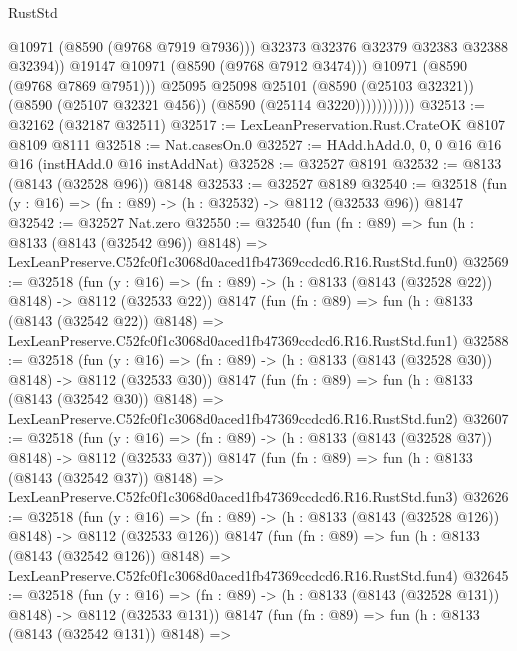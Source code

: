 \begin{lexlean}{RustStd}
\begin{coremodule}
                                @10971
                                (@8590 (@9768 @7919 @7936)))
                              @32373
                              @32376
                              @32379
                              @32383
                              @32388
                              @32394))
                          @19147
                          @10971
                          (@8590 (@9768 @7912 @3474)))
                        @10971
                        (@8590 (@9768 @7869 @7951)))
                      @25095
                      @25098
                      @25101
                      (@8590 (@25103 @32321))
                      (@8590 (@25107 @32321 @456))
                      (@8590 (@25114 @3220)))))))))))
@32513 := @32162 (@32187 @32511)
@32517 := LexLeanPreservation.Rust.CrateOK @8107 @8109 @8111
@32518 := Nat.casesOn.{0}
@32527 := HAdd.hAdd.{0, 0, 0} @16 @16 @16 (instHAdd.{0} @16 instAddNat)
@32528 := @32527 @8191
@32532 := @8133 (@8143 (@32528 @96)) @8148
@32533 := @32527 @8189
@32540 := @32518 (fun (y : @16) => (fn : @89) -> (h : @32532) -> @8112 (@32533 @96)) @8147
@32542 := @32527 Nat.zero
@32550 := @32540
    (fun (fn : @89) =>
    fun (h : @8133 (@8143 (@32542 @96)) @8148) =>
    LexLeanPreserve.C52fc0f1c3068d0aced1fb47369ccdcd6.R16.RustStd.fun0)
@32569 := @32518
    (fun (y : @16) => (fn : @89) -> (h : @8133 (@8143 (@32528 @22)) @8148) -> @8112 (@32533 @22))
    @8147
    (fun (fn : @89) =>
    fun (h : @8133 (@8143 (@32542 @22)) @8148) =>
    LexLeanPreserve.C52fc0f1c3068d0aced1fb47369ccdcd6.R16.RustStd.fun1)
@32588 := @32518
    (fun (y : @16) => (fn : @89) -> (h : @8133 (@8143 (@32528 @30)) @8148) -> @8112 (@32533 @30))
    @8147
    (fun (fn : @89) =>
    fun (h : @8133 (@8143 (@32542 @30)) @8148) =>
    LexLeanPreserve.C52fc0f1c3068d0aced1fb47369ccdcd6.R16.RustStd.fun2)
@32607 := @32518
    (fun (y : @16) => (fn : @89) -> (h : @8133 (@8143 (@32528 @37)) @8148) -> @8112 (@32533 @37))
    @8147
    (fun (fn : @89) =>
    fun (h : @8133 (@8143 (@32542 @37)) @8148) =>
    LexLeanPreserve.C52fc0f1c3068d0aced1fb47369ccdcd6.R16.RustStd.fun3)
@32626 := @32518
    (fun (y : @16) => (fn : @89) -> (h : @8133 (@8143 (@32528 @126)) @8148) -> @8112 (@32533 @126))
    @8147
    (fun (fn : @89) =>
    fun (h : @8133 (@8143 (@32542 @126)) @8148) =>
    LexLeanPreserve.C52fc0f1c3068d0aced1fb47369ccdcd6.R16.RustStd.fun4)
@32645 := @32518
    (fun (y : @16) => (fn : @89) -> (h : @8133 (@8143 (@32528 @131)) @8148) -> @8112 (@32533 @131))
    @8147
    (fun (fn : @89) =>
    fun (h : @8133 (@8143 (@32542 @131)) @8148) =>

\end{coremodule}
\end{lexlean}
